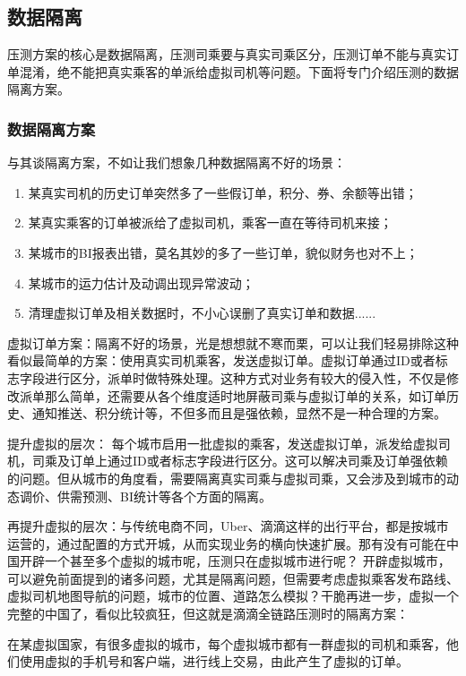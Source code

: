 \documentclass[12pt]{article}
\begin{document}
\subsection{数据隔离}
压测方案的核心是数据隔离，压测司乘要与真实司乘区分，压测订单不能与真实订单混淆，绝不能把真实乘客的单派给虚拟司机等问题。下面将专门介绍压测的数据隔离方案。

\subsubsection{数据隔离方案}
与其谈隔离方案，不如让我们想象几种数据隔离不好的场景：
\begin{enumerate}
\setlength{\itemsep}{0pt}
\setlength{\parsep}{0pt}
\setlength{\parskip}{0pt}
    \item 某真实司机的历史订单突然多了一些假订单，积分、券、余额等出错；
    \item 某真实乘客的订单被派给了虚拟司机，乘客一直在等待司机来接；
    \item 某城市的BI报表出错，莫名其妙的多了一些订单，貌似财务也对不上；
    \item 某城市的运力估计及动调出现异常波动；
    \item 清理虚拟订单及相关数据时，不小心误删了真实订单和数据......
\end{enumerate}

虚拟订单方案：隔离不好的场景，光是想想就不寒而栗，可以让我们轻易排除这种看似最简单的方案：使用真实司机乘客，发送虚拟订单。虚拟订单通过ID或者标志字段进行区分，派单时做特殊处理。这种方式对业务有较大的侵入性，不仅是修改派单那么简单，还需要从各个维度适时地屏蔽司乘与虚拟订单的关系，如订单历史、通知推送、积分统计等，不但多而且是强依赖，显然不是一种合理的方案。

提升虚拟的层次： 每个城市启用一批虚拟的乘客，发送虚拟订单，派发给虚拟司机，司乘及订单上通过ID或者标志字段进行区分。这可以解决司乘及订单强依赖的问题。但从城市的角度看，需要隔离真实司乘与虚拟司乘，又会涉及到城市的动态调价、供需预测、BI统计等各个方面的隔离。

再提升虚拟的层次：与传统电商不同，Uber、滴滴这样的出行平台，都是按城市运营的，通过配置的方式开城，从而实现业务的横向快速扩展。那有没有可能在中国开辟一个甚至多个虚拟的城市呢，压测只在虚拟城市进行呢？ 开辟虚拟城市，可以避免前面提到的诸多问题，尤其是隔离问题，但需要考虑虚拟乘客发布路线、虚拟司机地图导航的问题，城市的位置、道路怎么模拟？干脆再进一步，虚拟一个完整的中国了，看似比较疯狂，但这就是滴滴全链路压测时的隔离方案：

在某虚拟国家，有很多虚拟的城市，每个虚拟城市都有一群虚拟的司机和乘客，他们使用虚拟的手机号和客户端，进行线上交易，由此产生了虚拟的订单。
\end{document}
